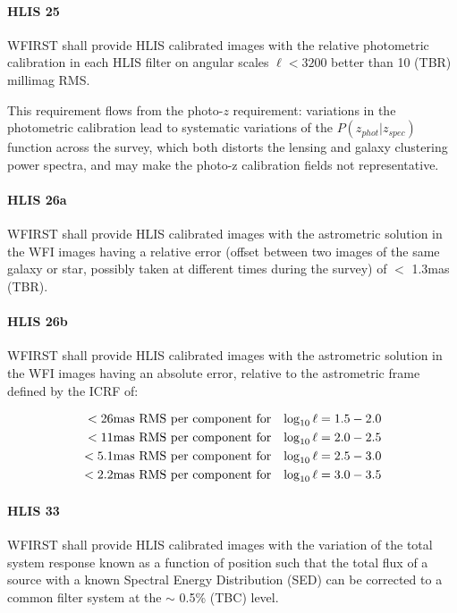 \paragraph{HLIS 25} WFIRST shall provide HLIS calibrated images with the relative
photometric calibration in each HLIS filter on angular scales $\ell < 3200$ better than
10 (TBR) millimag RMS.

This requirement flows from the photo-$z$ requirement: variations in the
photometric calibration lead to systematic variations of the $P(z_{phot}|z_{spec})$
function across the survey, which both distorts the lensing and galaxy
clustering power spectra, and may make the photo-z calibration fields not
representative.

\paragraph{HLIS 26a} WFIRST shall provide HLIS calibrated images with the astrometric
solution in the WFI images having a relative error (offset between two images of
the same galaxy or star, possibly taken at different times during the survey) of $<$
1.3mas (TBR).

\paragraph{HLIS 26b} WFIRST shall provide HLIS calibrated images with the astrometric
solution in the WFI images having an absolute error, relative to the astrometric
frame defined by the ICRF of:

\begin{eqnarray}
<26  & \rm{mas\ RMS\ per\ component\ for} & \log_{10}\ell = 1.5 - 2.0\\
<11  & \rm{mas\ RMS\ per\ component\ for} & \log_{10}\ell = 2.0 - 2.5\\
<5.1 & \rm{mas\ RMS\ per\ component\ for} & \log_{10}\ell = 2.5 - 3.0\\
<2.2 & \rm{mas\ RMS\ per\ component\ for} & \log_{10}\ell = 3.0 - 3.5
\end{eqnarray}

\paragraph{HLIS 33} WFIRST shall provide HLIS calibrated images with the
variation of the total system response known as a function of position such that
the total flux of a source with a known Spectral Energy Distribution (SED) can
be corrected to a common filter system at the $\sim$ 0.5\% (TBC) level.

